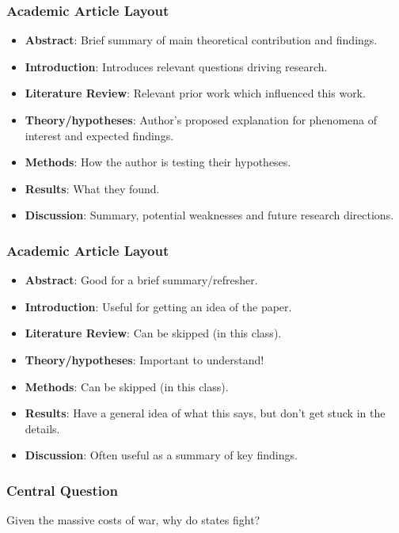 \documentclass{beamer}
\begin{document}
\begin{frame} 
	\frametitle{\LARGE{Academic Article Layout}}
	\begin{itemize}
		\item \textbf{Abstract}: Brief summary of main theoretical contribution and findings. \pause
		\item \textbf{Introduction}: Introduces relevant questions driving research. \pause
		\item \textbf{Literature Review}: Relevant prior work which influenced this work. \pause
		\item \textbf{Theory/hypotheses}: Author's proposed explanation for phenomena of interest and expected findings. \pause
		\item \textbf{Methods}: How the author is testing their hypotheses. \pause
		\item \textbf{Results}: What they found. \pause
		\item \textbf{Discussion}: Summary, potential weaknesses and future research directions. 
	\end{itemize}
\end{frame}

\begin{frame} 
	\frametitle{\LARGE{Academic Article Layout}}
	\begin{itemize}
		\item \textbf{Abstract}: Good for a brief summary/refresher. \pause
		\item \textbf{Introduction}: Useful for getting an idea of the paper. \pause
		\item \textbf{Literature Review}: Can be skipped (in this class). \pause
		\item \textbf{Theory/hypotheses}: Important to understand! \pause
		\item \textbf{Methods}: Can be skipped (in this class). \pause
		\item \textbf{Results}: Have a general idea of what this says, but don't get stuck in the details. \pause
		\item \textbf{Discussion}: Often useful as a summary of key findings. 
	\end{itemize}
\end{frame}

\begin{frame} 
	\frametitle{\LARGE{Central Question}}
	\begin{center}
		\LARGE Given the massive costs of war, why do states fight? 
	\end{center}
\end{frame}
\end{document}
